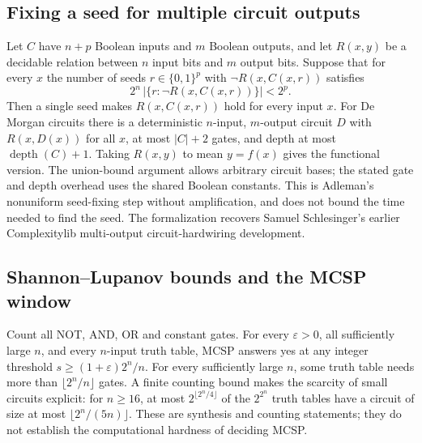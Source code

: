 \begin{result}
\subsection{Fixing a seed for multiple circuit outputs}
Let $C$ have $n+p$ Boolean inputs and $m$ Boolean outputs, and let
$R(x,y)$ be a decidable relation between $n$ input bits and $m$ output bits.
Suppose that for every $x$ the number of seeds $r\in\{0,1\}^p$ with
$\neg R(x,C(x,r))$ satisfies
\[
  2^n\,\bigl|\{r:\neg R(x,C(x,r))\}\bigr|<2^p.
\]
Then a single seed makes $R(x,C(x,r))$ hold for every input $x$.
For De Morgan circuits there is a deterministic $n$-input, $m$-output circuit
$D$ with $R(x,D(x))$ for all $x$, at most $|C|+2$ gates, and depth at most
$\operatorname{depth}(C)+1$. Taking $R(x,y)$ to mean $y=f(x)$ gives the
functional version. The union-bound argument allows arbitrary circuit bases;
the stated gate and depth overhead uses the shared Boolean constants. This is
Adleman's nonuniform seed-fixing step without amplification, and does not bound
the time needed to find the seed.\citep{Adleman1978,AroraBarak09}
The formalization recovers Samuel Schlesinger's earlier Complexitylib
multi-output circuit-hardwiring development.
\end{result}

\begin{result}
\subsection{Shannon--Lupanov bounds and the MCSP window}
Count all NOT, AND, OR and constant gates. For every $\varepsilon>0$, all
sufficiently large $n$, and every $n$-input truth table, MCSP answers yes at
any integer threshold $s\ge(1+\varepsilon)2^n/n$. For every sufficiently large
$n$, some truth table needs more than $\lfloor2^n/n\rfloor$ gates.
A finite counting bound makes the scarcity of small circuits explicit: for
$n\ge16$, at most $2^{\lfloor2^n/4\rfloor}$ of the $2^{2^n}$ truth tables
have a circuit of size at most $\lfloor2^n/(5n)\rfloor$.
These are synthesis and counting statements; they do not establish the
computational hardness of deciding MCSP.\citep{Shannon1949,Lupanov1958}
\end{result}


